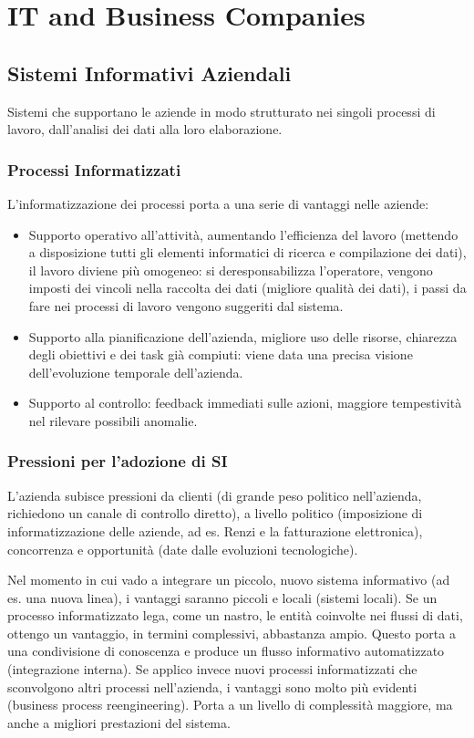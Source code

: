 \chapter{IT and Business Companies}
\label{chap:IT and Business Companies}
\section{Sistemi Informativi Aziendali}
\label{sec:Business Information System}
Sistemi che supportano le aziende in modo strutturato nei singoli processi di lavoro,
dall'analisi dei dati alla loro elaborazione.
\subsection{Processi Informatizzati}
L'informatizzazione dei processi porta a una serie di vantaggi nelle aziende:
\begin{itemize}
  \item Supporto operativo all'attivit\`a, aumentando l'efficienza del lavoro (mettendo a disposizione
  tutti gli elementi informatici di ricerca e compilazione dei dati), il lavoro diviene pi\`u omogeneo: si
  deresponsabilizza l'operatore, vengono imposti dei vincoli nella raccolta dei dati (migliore
  qualit\`a dei dati), i passi da fare nei processi di lavoro vengono suggeriti dal sistema.
  \item Supporto alla pianificazione dell'azienda, migliore uso delle risorse, chiarezza
  degli obiettivi e dei task gi\`a compiuti: viene data una precisa visione dell'evoluzione
  temporale dell'azienda.
  \item Supporto al controllo: feedback immediati sulle azioni, maggiore tempestivit\`a nel
  rilevare possibili anomalie.
\end{itemize}

\subsection{Pressioni per l'adozione di SI}
\label{sub:Processi informatizzati}
L'azienda subisce pressioni da clienti (di grande peso politico nell'azienda, richiedono un canale di controllo diretto),
a livello politico (imposizione
di informatizzazione delle aziende, ad es. Renzi e la fatturazione elettronica),
 concorrenza e opportunit\`a (date dalle evoluzioni tecnologiche).

Nel momento in cui vado a integrare un piccolo, nuovo sistema informativo (ad es. una nuova linea),
i vantaggi saranno piccoli e locali (sistemi locali).
Se un processo informatizzato lega, come un nastro, le entit\`a coinvolte nei flussi di dati, ottengo un vantaggio, in termini complessivi,
abbastanza ampio. Questo porta a una condivisione di conoscenza e produce un flusso informativo
automatizzato (integrazione interna).
Se applico invece nuovi processi informatizzati che sconvolgono altri processi nell'azienda, i vantaggi sono
molto pi\`u evidenti (business process reengineering). Porta a un livello di
complessit\`a maggiore, ma anche a migliori prestazioni del sistema.

